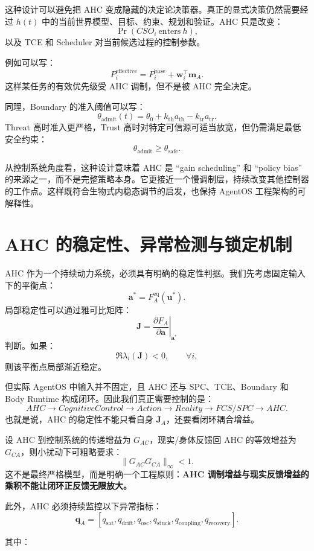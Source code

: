 这种设计可以避免把 AHC 变成隐藏的决定论决策器。真正的显式决策仍然需要经过 $h(t)$ 中的当前世界模型、目标、约束、规划和验证。AHC 只是改变：
\[
\Pr(
CSO_i\ \mathrm{enters}\ h
),
\]
以及 TCE 和 Scheduler 对当前候选过程的控制参数。

例如可以写：
\[
P_i^{\mathrm{effective}}
=
P_i^{\mathrm{base}}
+
\mathbf w_i^\top
\mathbf m_A.
\]
这样某任务的有效优先级受 AHC 调制，但不是被 AHC 完全决定。

同理，Boundary 的准入阈值可以写：
\[
\theta_{\mathrm{admit}}(t)
=
\theta_0
+
k_{\mathrm{th}}
a_{\mathrm{th}}
-
k_{\mathrm{tr}}
a_{\mathrm{tr}}.
\]
Threat 高时准入更严格，Trust 高时对特定可信源可适当放宽，但仍需满足最低安全约束：
\[
\theta_{\mathrm{admit}}
\ge
\theta_{\mathrm{safe}}.
\]

从控制系统角度看，这种设计意味着 AHC 是 ``gain scheduling'' 和 ``policy bias'' 的来源之一，而不是完整策略本身。它更接近一个慢调制层，持续改变其他控制器的工作点。这样既符合生物式内稳态调节的启发，也保持 AgentOS 工程架构的可解释性。


\section{AHC 的稳定性、异常检测与锁定机制}

AHC 作为一个持续动力系统，必须具有明确的稳定性判据。我们先考虑固定输入下的平衡点：
\[
\mathbf a^*
=
F_A^{\mathrm{eq}}(
\mathbf u^*
).
\]
局部稳定性可以通过雅可比矩阵：
\[
\mathbf J
=
\left.
\frac{\partial F_A}
{\partial\mathbf a}
\right|_{\mathbf a^*}
\]
判断。如果：
\[
\Re\lambda_i(\mathbf J)<0,
\qquad
\forall i,
\]
则该平衡点局部渐近稳定。

但实际 AgentOS 中输入并不固定，且 AHC 还与 SPC、TCE、Boundary 和 Body Runtime 构成闭环。因此我们真正需要控制的是：
\[
AHC
\rightarrow
CognitiveControl
\rightarrow
Action
\rightarrow
Reality
\rightarrow
FCS/SPC
\rightarrow
AHC.
\]
也就是说，AHC 的稳定性不能只看自身 $\mathbf J_A$，还要看闭环耦合增益。

设 AHC 到控制系统的传递增益为 $G_{AC}$，现实/身体反馈回 AHC 的等效增益为 $G_{CA}$，则小扰动下可粗略要求：
\[
\|G_{AC}G_{CA}\|_\infty<1.
\]
这不是最终严格模型，而是明确一个工程原则：\textbf{AHC 调制增益与现实反馈增益的乘积不能让闭环正反馈无限放大。}

此外，AHC 必须持续监控以下异常指标：
\[
\mathbf q_A
=
[
q_{\mathrm{sat}},
q_{\mathrm{drift}},
q_{\mathrm{osc}},
q_{\mathrm{stuck}},
q_{\mathrm{coupling}},
q_{\mathrm{recovery}}
].
\]

其中：

